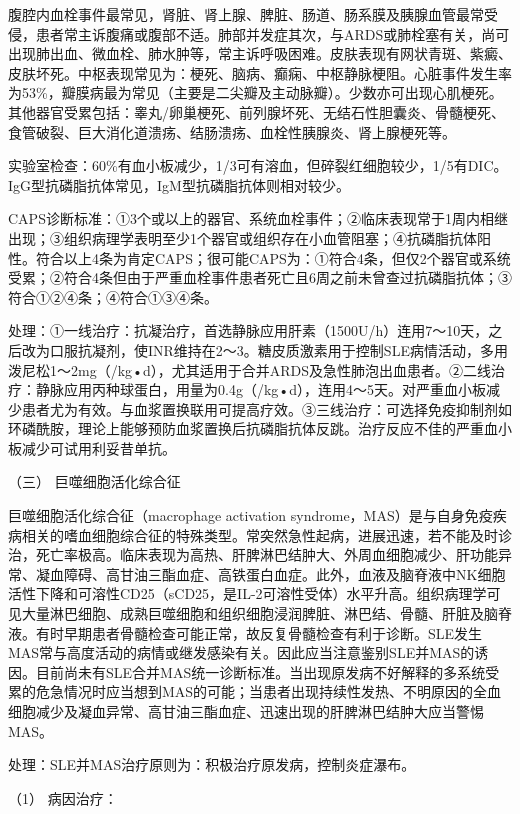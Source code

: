 腹腔内血栓事件最常见，肾脏、肾上腺、脾脏、肠道、肠系膜及胰腺血管最常受侵，患者常主诉腹痛或腹部不适。肺部并发症其次，与ARDS或肺栓塞有关，尚可出现肺出血、微血栓、肺水肿等，常主诉呼吸困难。皮肤表现有网状青斑、紫癜、皮肤坏死。中枢表现常见为：梗死、脑病、癫痫、中枢静脉梗阻。心脏事件发生率为53\%，瓣膜病最为常见（主要是二尖瓣及主动脉瓣）。少数亦可出现心肌梗死。其他器官受累包括：睾丸/卵巢梗死、前列腺坏死、无结石性胆囊炎、骨髓梗死、食管破裂、巨大消化道溃疡、结肠溃疡、血栓性胰腺炎、肾上腺梗死等。

实验室检查：60\%有血小板减少，1/3可有溶血，但碎裂红细胞较少，1/5有DIC。IgG型抗磷脂抗体常见，IgM型抗磷脂抗体则相对较少。

CAPS诊断标准：①3个或以上的器官、系统血栓事件；②临床表现常于1周内相继出现；③组织病理学表明至少1个器官或组织存在小血管阻塞；④抗磷脂抗体阳性。符合以上4条为肯定CAPS；很可能CAPS为：①符合4条，但仅2个器官或系统受累；②符合4条但由于严重血栓事件患者死亡且6周之前未曾查过抗磷脂抗体；③符合①②④条；④符合①③④条。

处理：①一线治疗：抗凝治疗，首选静脉应用肝素（1500U/h）连用7～10天，之后改为口服抗凝剂，使INR维持在2～3。糖皮质激素用于控制SLE病情活动，多用泼尼松1～2mg（/kg•d），尤其适用于合并ARDS及急性肺泡出血患者。②二线治疗：静脉应用丙种球蛋白，用量为0.4g（/kg•d），连用4～5天。对严重血小板减少患者尤为有效。与血浆置换联用可提高疗效。③三线治疗：可选择免疫抑制剂如环磷酰胺，理论上能够预防血浆置换后抗磷脂抗体反跳。治疗反应不佳的严重血小板减少可试用利妥昔单抗。

\hypertarget{text00347.htmlux5cux23CHP14-1-3-9-3}{}
（三） 巨噬细胞活化综合征

巨噬细胞活化综合征（macrophage activation
syndrome，MAS）是与自身免疫疾病相关的嗜血细胞综合征的特殊类型。常突然急性起病，进展迅速，若不能及时诊治，死亡率极高。临床表现为高热、肝脾淋巴结肿大、外周血细胞减少、肝功能异常、凝血障碍、高甘油三酯血症、高铁蛋白血症。此外，血液及脑脊液中NK细胞活性下降和可溶性CD25（sCD25，是IL-2可溶性受体）水平升高。组织病理学可见大量淋巴细胞、成熟巨噬细胞和组织细胞浸润脾脏、淋巴结、骨髓、肝脏及脑脊液。有时早期患者骨髓检查可能正常，故反复骨髓检查有利于诊断。SLE发生MAS常与高度活动的病情或继发感染有关。因此应当注意鉴别SLE并MAS的诱因。目前尚未有SLE合并MAS统一诊断标准。当出现原发病不好解释的多系统受累的危急情况时应当想到MAS的可能；当患者出现持续性发热、不明原因的全血细胞减少及凝血异常、高甘油三酯血症、迅速出现的肝脾淋巴结肿大应当警惕MAS。

处理：SLE并MAS治疗原则为：积极治疗原发病，控制炎症瀑布。

\hypertarget{text00347.htmlux5cux23CHP14-1-3-9-3-1}{}
（1） 病因治疗：

